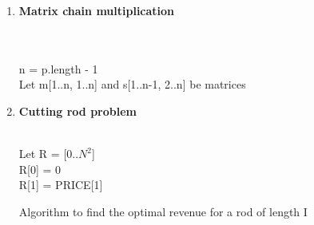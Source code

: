 \documentclass[11pt]{article}
\begin{document}
\begin{enumerate}
    \item \textbf{Matrix chain multiplication} \\\\
    \begin{algorithm}[H]
        \Indm{}\\
        \Indp
            n = p.length - 1 \\
            Let m[1..n, 1..n] and s[1..n-1, 2..n] be matrices \\
    \end{algorithm}
    
    \item \textbf{Cutting rod problem} \\\\
    \begin{algorithm}[H]
        Let R = [0..$N^2$] \\
        R[0] = 0 \\
        R[1] = PRICE[1] \\
        \caption{Algorithm to find the optimal revenue for a rod of length I}
    \end{algorithm}
    

\end{enumerate}
\end{document}
